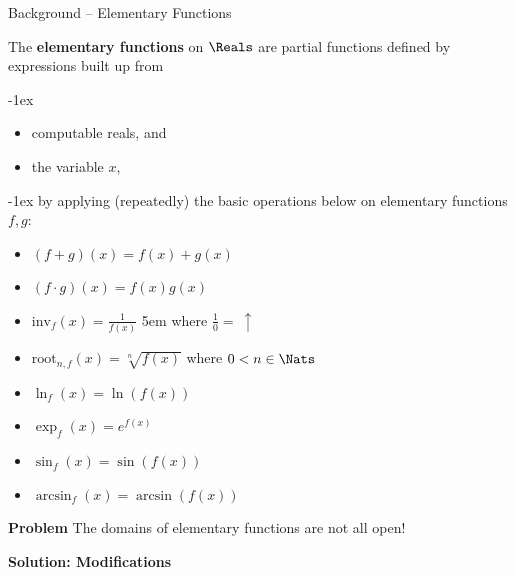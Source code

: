 \begin{frame}{Background -- Elementary Functions}
    \pause \vspace{-2em}
    \begin{minipage}[t]{0.48\linewidth}
        \begin{definition}
            The \textbf{elementary functions} on $\Reals$  are partial functions deﬁned by expressions built up from 
            \pause

            \kern-1ex
            \begin{itemize}
                \setlength\itemsep{-1pt}
                \item computable reals, and
                \item the variable $x$,
            \end{itemize}
            \kern-1ex
            \pause by applying (repeatedly) the basic operations below on elementary functions $f,g$:
            \pause
            \begin{itemize}
                \setlength\itemsep{-1pt}
                \item $(f+g)(x) = f(x) + g(x)$ 
                \item $(f\cdot g)(x) = f(x)g(x)$
                \item $\mathrm{inv}_f(x) = \frac{1}{f(x)}$ \kern5em where $\frac{1}{0} =\ \uparrow$
                \item $\mathrm{root}_{n,f}(x) = \sqrt[n]{f(x)}$ \hfill where $0< n \in \Nats$
                \item $\ln_f(x) = \ln(f(x))$
                \item $\exp_f(x) = e^{f(x)}$
                \item $\sin_f(x) = \sin(f(x))$
                \item $\arcsin_f(x) = \arcsin(f(x))$
            \end{itemize}
        \end{definition}
    \end{minipage}
    \hfill
    \pause \begin{minipage}[t]{0.45\linewidth}
        \begin{exampleblock}{\textbf{\textcolor{BrickRed}{Problem}}}
            The domains of elementary functions are not all open!
        \end{exampleblock}
        \pause
        \begin{exampleblock}{\color{OliveGreen}\textbf{Solution: Modifications}}

\end{exampleblock}
\end{minipage}
\end{frame}
